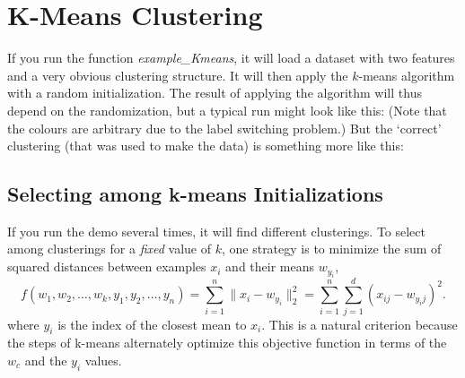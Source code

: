 \documentclass{article}
\def\norm#1{\|#1\|}
\begin{document}
\section{K-Means Clustering}

If you run the function \emph{example\_Kmeans}, it will load a dataset with two features and a very obvious clustering structure. It will then apply the $k$-means algorithm with a random initialization. The result of applying the algorithm will thus depend on the randomization, but a typical run might look like this:
(Note that the colours are arbitrary due to the label switching problem.)
But the `correct' clustering (that was used to make the data) is something more like this:

\subsection{Selecting among k-means Initializations}

If you run the demo several times, it will find different clusterings. To select among clusterings for a \emph{fixed} value of $k$, one strategy is to minimize the sum of squared distances between examples $x_i$ and their means $w_{y_i}$,
\[
f(w_1,w_2,\dots,w_k,y_1,y_2,\dots,y_n) = \sum_{i=1}^n \norm{x_i - w_{y_i}}_2^2 = \sum_{i=1}^n \sum_{j=1}^d (x_{ij} - w_{y_ij})^2.
\]
 where $y_i$ is the index of the closest mean to $x_i$. This is a natural criterion because the steps of k-means alternately optimize this objective function in terms of the $w_c$ and the $y_i$ values.
  
\end{document}
